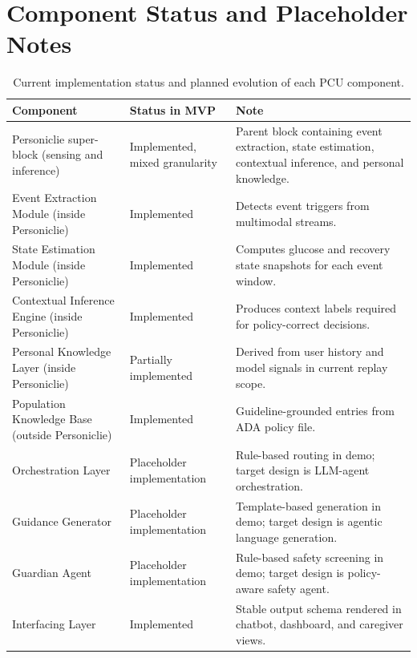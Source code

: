 \documentclass[11pt]{article}
\begin{document}
\section{Component Status and Placeholder Notes}
\begin{table}[h]
\centering
\begin{tabularx}{\textwidth}{>{\raggedright\arraybackslash}p{} >{\raggedright\arraybackslash}p{} >{\raggedright\arraybackslash}X}
\toprule
Component & Status in MVP & Note \\
\midrule
Personiclie super-block (sensing and inference) & Implemented, mixed granularity & Parent block containing event extraction, state estimation, contextual inference, and personal knowledge. \\
Event Extraction Module (inside Personiclie) & Implemented & Detects event triggers from multimodal streams. \\
State Estimation Module (inside Personiclie) & Implemented & Computes glucose and recovery state snapshots for each event window. \\
Contextual Inference Engine (inside Personiclie) & Implemented & Produces context labels required for policy-correct decisions. \\
Personal Knowledge Layer (inside Personiclie) & Partially implemented & Derived from user history and model signals in current replay scope. \\
Population Knowledge Base (outside Personiclie) & Implemented & Guideline-grounded entries from ADA policy file. \\
Orchestration Layer & Placeholder implementation & Rule-based routing in demo; target design is LLM-agent orchestration. \\
Guidance Generator & Placeholder implementation & Template-based generation in demo; target design is agentic language generation. \\
Guardian Agent & Placeholder implementation & Rule-based safety screening in demo; target design is policy-aware safety agent. \\
Interfacing Layer & Implemented & Stable output schema rendered in chatbot, dashboard, and caregiver views. \\
\bottomrule
\end{tabularx}
\caption{Current implementation status and planned evolution of each PCU component.}
\label{tab:status}
\end{table}
\end{document}
